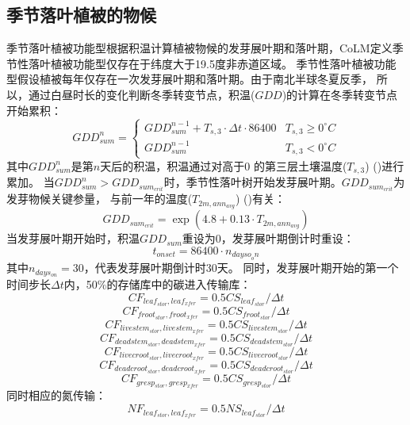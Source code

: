 \subsection{季节落叶植被的物候}\label{季节落叶植被的物候}
季节落叶植被功能型根据积温计算植被物候的发芽展叶期和落叶期，CoLM定义季节性落叶植被功能型仅存在于纬度大于19.5度非赤道区域。
季节性落叶植被功能型假设植被每年仅存在一次发芽展叶期和落叶期。由于南北半球冬夏反季，
所以，通过白昼时长的变化判断冬季转变节点，积温($GDD$)的计算在冬季转变节点开始累积\citep{white1997continental}：
\begin{equation}
GDD _{sum}^{n}=\left\{\begin{array}{ll}GDD _{sum}^{n-1}+T_{s, 3} \cdot \Delta t \cdot 86400 & T_{s, 3} \geq 0^{\circ}{C} \\ GDD _{sum}^{n-1} & T_{s, 3}<0^{\circ}{C}\end{array}\right.
\end{equation}
其中$GDD_{sum}^n$是第$n$天后的积温，积温通过对高于0 \textcelsius 的第三层土壤温度($T_{s,3}$) (\textcelsius)进行累加。
当$GDD_{sum}^n>{GDD}_{sum_{crit}}$时，季节性落叶树开始发芽展叶期。${GDD}_{sum_{crit}}$为发芽物候关键参量，
与前一年的温度($T_{2m,ann_{avg}}$) (\textcelsius)有关：
\begin{equation}
GDD _{sum_{c r i t}}=\exp \left(4.8+0.13 \cdot T_{2 m, ann_{avg}}\right)
\end{equation}
当发芽展叶期开始时，积温${GDD}_{sum}$重设为0，发芽展叶期倒计时重设：
\begin{equation}
t_{o n s e t}=86400 \cdot n_{ {dayso }_{o} n}
\end{equation}
其中$n_{days_{on}}=30$，代表发芽展叶期倒计时30天。
同时，发芽展叶期开始的第一个时间步长$\Delta t$内，50\%的存储库中的碳进入传输库：
\begin{equation}
  CF_{leaf_{stor},leaf_{xfer}}=0.5 CS_{leaf_{stor}}/\Delta t
\end{equation}
\begin{equation}
  CF_{froot_{stor},froot_{xfer}}=0.5  CS_{froot_{stor}}/\Delta t
\end{equation}
\begin{equation}
  CF_{livestem_{stor},livestem_{xfer}}=0.5  CS_{livestem_{stor}}/\Delta t
\end{equation}
\begin{equation}
  CF_{deadstem_{stor},deadstem_{xfer}}=0.5  CS_{deadstem_{stor}}/\Delta t
\end{equation}
\begin{equation}
  CF_{livecroot_{stor},livecroot_{xfer}}=0.5  CS_{livecroot_{stor}}/\Delta t
\end{equation}
\begin{equation}
  CF_{deadcroot_{stor},deadcroot_{xfer}}=0.5 CS_{deadcroot_{stor}}/\Delta t
\end{equation}
\begin{equation}
  CF_{gresp_{stor},gresp_{xfer}}=0.5  CS_{gresp_{stor}}/\Delta t
\end{equation}
同时相应的氮传输：
\begin{equation}
NF_{leaf_{stor},leaf_{xfer}}=0.5  NS_{leaf_{stor}}/\Delta t
\end{equation}

